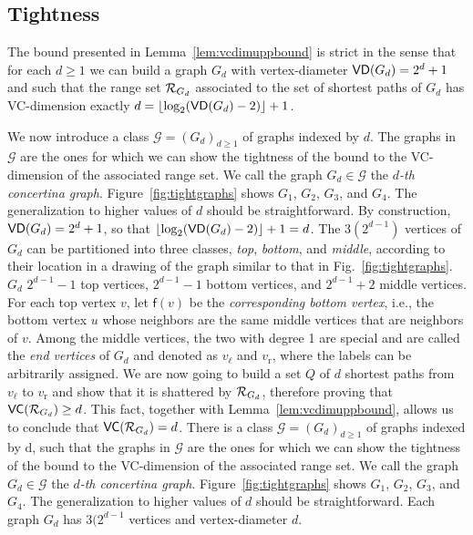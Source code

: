 \subsection{Tightness}\label{sec:tightness}
The bound presented in Lemma~\ref{lem:vcdimuppbound} is strict in the sense that
for each $d\ge 1$ we can build a graph $G_d$ with vertex-diameter
$\mathsf{VD}(G_d)=2^d+1$ and such that the range set $\mathcal{R}_{G_d}$ associated to the set of
shortest paths of $G_d$ has VC-dimension exactly
$d=\lfloor\log_2(\mathsf{VD}(G_d)-2)\rfloor+1$. 

\ifproof
We now introduce a class $\mathcal{G}=(G_d)_{d\ge 1}$ of graphs indexed by $d$.
The graphs in $\mathcal{G}$ are the ones for which we can show the tightness of
the bound to the VC-dimension of the associated range set.
We call the graph $G_d\in\mathcal{G}$ the \emph{$d$-th concertina graph}.
Figure~\ref{fig:tightgraphs} shows $G_1$, $G_2$, $G_3$, and $G_4$. The
generalization to higher values of $d$ should be straightforward.
By construction, $\mathsf{VD}(G_d)=2^d+1$, so that
$\lfloor\log_2(\mathsf{VD}(G_d)-2)\rfloor+1=d$. The $3(2^{d-1})$ vertices of $G_d$ can
be partitioned into three classes, \emph{top}, \emph{bottom}, and \emph{middle},
according to their location in a drawing of the graph similar to that in
Fig.~\ref{fig:tightgraphs}. $G_d$ $2^{d-1}-1$ top vertices, $2^{d-1}-1$ bottom vertices, and
$2^{d-1}+2$ middle vertices. For each top vertex $v$, let $\mathsf{f}(v)$ be the
\emph{corresponding bottom vertex}, i.e., the bottom vertex $u$ whose neighbors
are the same middle vertices that are neighbors of $v$. Among the middle
vertices, the two with degree 1 are special and are called the \emph{end
vertices} of $G_d$ and denoted as $v_\ell$ and $v_\mathrm{r}$, where the
labels can be arbitrarily assigned. We are now going to build a set $Q$ of $d$
shortest paths from $v_\ell$ to $v_\mathrm{r}$ and show that it is
shattered by $\mathcal{R}_{G_d}$, therefore proving that $\mathsf{VC}(\mathcal{R}_{G_d})\ge d$.
This fact, together with Lemma~\ref{lem:vcdimuppbound}, allows us to conclude
that $\mathsf{VC}(\mathcal{R}_{G_d})=d$. 
\else
There is a class $\mathcal{G}=(G_d)_{d\ge 1}$ of graphs indexed by d, such that
the graphs in $\mathcal{G}$ are the ones for which we can show the tightness of
the bound to the VC-dimension of the associated range set. We call the graph
$G_d\in\mathcal{G}$ the \emph{$d$-th concertina graph}.
Figure~\ref{fig:tightgraphs} shows $G_1$, $G_2$, $G_3$, and $G_4$. The
generalization to higher values of $d$ should be straightforward. Each graph
$G_d$ has $3(2^{d-1}$ vertices and vertex-diameter $d$.
\fi


